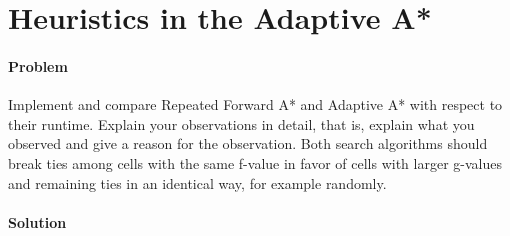 \section{Heuristics in the Adaptive A*}

\paragraph{Problem}
Implement and compare Repeated Forward A* and Adaptive A* with respect to their
runtime. Explain your observations in detail, that is, explain what you
observed and give a reason for the observation. Both search algorithms should
break ties among cells with the same f-value in favor of cells with larger
g-values and remaining ties in an identical way, for example randomly.

\paragraph{Solution}
